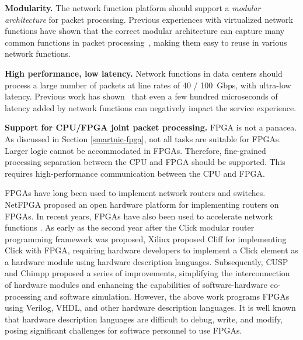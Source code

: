 \textbf{Modularity.} The network function platform should support a \textit{modular architecture} for packet processing. Previous experiences with virtualized network functions have shown that the correct modular architecture can capture many common functions in packet processing~\cite{kohler2000click,martins2014clickos}, making them easy to reuse in various network functions.

\textbf{High performance, low latency.} Network functions in data centers should process a large number of packets at line rates of 40 / 100~Gbps, with ultra-low latency. Previous work has shown~\cite{rollback-mb} that even a few hundred microseconds of latency added by network functions can negatively impact the service experience.

\textbf{Support for CPU/FPGA joint packet processing.} FPGA is not a panacea. As discussed in Section \ref{smartnic-fpga}, not all tasks are suitable for FPGAs. Larger logic cannot be accommodated in FPGAs. Therefore, fine-grained processing separation between the CPU and FPGA should be supported. This requires high-performance communication between the CPU and FPGA.

FPGAs have long been used to implement network routers and switches. NetFPGA \cite{lockwood2007netfpga} proposed an open hardware platform for implementing routers on FPGAs. In recent years, FPGAs have also been used to accelerate network functions \cite{rubow2010chimpp,lavasani2012compiling}. As early as the second year after the Click modular router \cite{kohler2000click} programming framework was proposed, Xilinx proposed Cliff \cite{kulkarni2004mapping} for implementing Click with FPGA, requiring hardware developers to implement a Click element as a hardware module using hardware description languages. Subsequently, CUSP \cite{schelle2005cusp} and Chimpp \cite{rubow2010chimpp} proposed a series of improvements, simplifying the interconnection of hardware modules and enhancing the capabilities of software-hardware co-processing and software simulation. However, the above work programs FPGAs using Verilog, VHDL, and other hardware description languages. It is well known that hardware description languages are difficult to debug, write, and modify, posing significant challenges for software personnel to use FPGAs.

